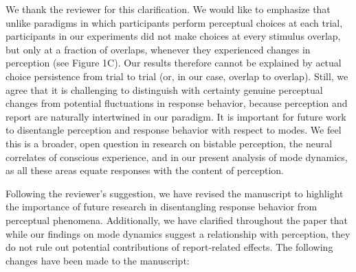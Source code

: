 \documentclass[
]{article}
\begin{document}
We thank the reviewer for this clarification. We would like to emphasize
that unlike paradigms in which participants perform perceptual choices
at each trial, participants in our experiments did not make choices at
every stimulus overlap, but only at a fraction of overlaps, whenever
they experienced changes in perception (see Figure 1C). Our results
therefore cannot be explained by actual choice persistence from trial to
trial (or, in our case, overlap to overlap). Still, we agree that it is
challenging to distinguish with certainty genuine perceptual changes
from potential fluctuations in response behavior, because perception and
report are naturally intertwined in our paradigm. It is important for
future work to disentangle perception and response behavior with respect
to modes. We feel this is a broader, open question in research on
bistable perception, the neural correlates of conscious experience, and
in our present analysis of mode dynamics, as all these areas equate
responses with the content of perception.

Following the reviewer's suggestion, we have revised the manuscript to
highlight the importance of future research in disentangling response
behavior from perceptual phenomena. Additionally, we have clarified
throughout the paper that while our findings on mode dynamics suggest a
relationship with perception, they do not rule out potential
contributions of report-related effects. The following changes have been
made to the manuscript:
\end{document}
